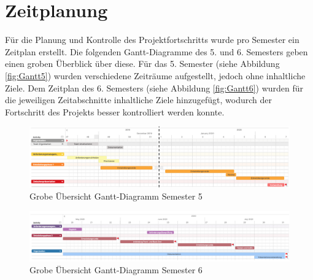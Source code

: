 \section{Zeitplanung}\label{ch:zeitplanung}
Für die Planung und Kontrolle des Projektfortschritts wurde pro Semester ein Zeitplan erstellt.
Die folgenden Gantt-Diagramme des 5. und 6. Semesters geben einen groben Überblick über diese.
Für das 5. Semester (siehe Abbildung \vref{fig:Gantt5}) wurden verschiedene Zeiträume aufgestellt, jedoch ohne inhaltliche Ziele.
Dem Zeitplan des 6. Semesters (siehe Abbildung \vref{fig:Gantt6}) wurden für die jeweiligen Zeitabschnitte inhaltliche Ziele hinzugefügt, wodurch der Fortschritt des Projekts besser kontrolliert werden konnte.

\begin{figure}[H]
	\centering 
	\includegraphics[width=\textwidth]{img/GanttSemester5.png}
	\captionsetup{format=hang}
	\caption[Grobe Übersicht Gantt-Diagramm Semester 5]{\label{fig:Gantt5}Grobe Übersicht Gantt-Diagramm Semester 5}
\end{figure}

\begin{figure}[H]
	\centering 
	\includegraphics[width=\textwidth]{img/GanttSemester6.png}
	\captionsetup{format=hang}
	\caption[Grobe Übersicht Gantt-Diagramm Semester 6]{\label{fig:Gantt6}Grobe Übersicht Gantt-Diagramm Semester 6}
\end{figure}
